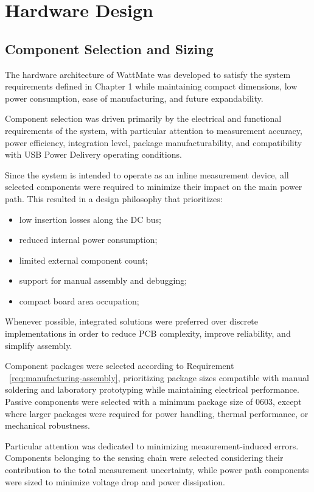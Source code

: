 \chapter{Hardware Design}

\section{Component Selection and Sizing}

The hardware architecture of WattMate was developed to satisfy the system requirements defined in Chapter 1 while maintaining compact dimensions, low power consumption, ease of manufacturing, and future expandability.

Component selection was driven primarily by the electrical and functional requirements of the system, with particular attention to measurement accuracy, power efficiency, integration level, package manufacturability, and compatibility with USB Power Delivery operating conditions.

Since the system is intended to operate as an inline measurement device, all selected components were required to minimize their impact on the main power path. This resulted in a design philosophy that prioritizes:
\begin{itemize}
    \item low insertion losses along the DC bus;
    \item reduced internal power consumption;
    \item limited external component count;
    \item support for manual assembly and debugging;
    \item compact board area occupation;
\end{itemize}

Whenever possible, integrated solutions were preferred over discrete implementations in order to reduce PCB complexity, improve reliability, and simplify assembly.

Component packages were selected according to Requirement ~\ref{req:manufacturing-assembly}, prioritizing package sizes compatible with manual soldering and laboratory prototyping while maintaining electrical performance. Passive components were selected with a minimum package size of 0603, except where larger packages were required for power handling, thermal performance, or mechanical robustness.

Particular attention was dedicated to minimizing measurement-induced errors. Components belonging to the sensing chain were selected considering their contribution to the total measurement uncertainty, while power path components were sized to minimize voltage drop and power dissipation.

